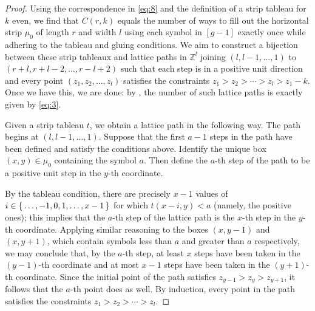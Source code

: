 \documentclass[11pt,reqno]{amsart}
\newcommand*{\Z}{\mathbb{Z}}
\theoremstyle{definition}
\theoremstyle{problem}
\theoremstyle{plain}
\theoremstyle{remark}
\theoremstyle{theorem}
\numberwithin{equation}{section}
\numberwithin{figure}{section}
\begin{document}
\begin{proof}
  Using the correspondence in \cref{eq:8} and the definition of a
  strip tableau for $k$ even, we find that $C(r,k)$ equals the number
  of ways to fill out the horizontal strip $\mu_0$ of length $r$ and
  width $l$ using each symbol in $[g-1]$ exactly once while adhering
  to the tableau and gluing conditions.  We aim to construct a
  bijection between these strip tableaux and lattice paths in $\Z^l$
  joining $(l,l-1,\ldots,1)$ to $(r+l,r+l-2,\ldots,r-l+2)$ such that
  each step is in a positive unit direction and every point
  $(z_1,z_2,\ldots,z_l)$ satisfies the constraints
  $z_1>z_2>\cdots>z_l>z_1-k$.  Once we have this, we are done: by
  \cite[Theorem~10.18.6]{bona2015handbook}, the number of such lattice
  paths is exactly given by \cref{eq:3}.

  Given a strip tableau $t$, we obtain a lattice path in the following
  way.  The path begins at $(l,l-1,\ldots,1)$.  Suppose that the first
  $a-1$ steps in the path have been defined and satisfy the conditions
  above.  Identify the unique box $(x,y) \in \mu_0$ containing the
  symbol $a$.  Then define the $a$-th step of the path to be a
  positive unit step in the $y$-th coordinate.


  By the tableau condition, there are precisely $x-1$ values of
  $i \in \set{\ldots,-1,0,1,\ldots,x-1}$ for which $t(x-i,y) < a$
  (namely, the positive ones); this implies that the $a$-th step of
  the lattice path is the $x$-th step in the $y$-th coordinate.
  Applying similar reasoning to the boxes $(x,y-1)$ and $(x,y+1)$,
  which contain symbols less than $a$ and greater than $a$
  respectively, we may conclude that, by the $a$-th step, at least $x$
  steps have been taken in the $(y-1)$-th coordinate and at most $x-1$
  steps have been taken in the $(y+1)$-th coordinate.  Since the
  initial point of the path satisfies $z_{y-1} > z_y > z_{y+1}$, it
  follows that the $a$-th point does as well.  By induction, every
  point in the path satisfies the constraints $z_1>z_2>\cdots>z_l$.


\end{proof}
\end{document}
